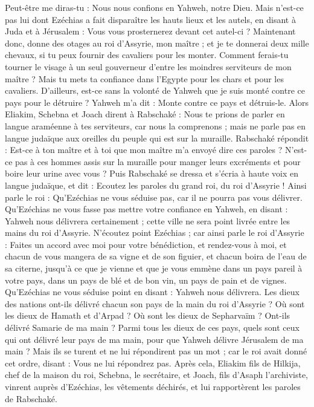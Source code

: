 \begin{multicols}{2}
Peut-être me diras-tu : Nous nous confions en Yahweh, notre Dieu. Mais n'est-ce pas lui dont Ezéchias a fait disparaître les hauts lieux et les autels, en disant à Juda et à Jérusalem : Vous vous prosternerez devant cet autel-ci ?
Maintenant donc, donne des otages au roi d’Assyrie, mon maître ; et je te donnerai deux mille chevaux, si tu peux fournir des cavaliers pour les monter.
Comment ferais-tu tourner le visage à un seul gouverneur d’entre les moindres serviteurs de mon maître ? Mais tu mets ta confiance dans l'Egypte pour les chars et pour les cavaliers.
D’ailleurs, est-ce sans la volonté de Yahweh que je suis monté contre ce pays pour le détruire ? Yahweh m'a dit : Monte contre ce pays et détruis-le.
Alors Eliakim, Schebna et Joach dirent à Rabschaké : Nous te prions de parler en langue araméenne à tes serviteurs, car nous la comprenons ; mais ne parle pas en langue judaïque aux oreilles du peuple qui est sur la muraille.
Rabschaké répondit : Est-ce à ton maître et à toi que mon maître m’a envoyé dire ces paroles ? N’est-ce pas à ces hommes assis sur la muraille pour manger leurs excréments et pour boire leur urine avec vous ?
Puis Rabschaké se dressa et s'écria à haute voix en langue judaïque, et dit : Ecoutez les paroles du grand roi, du roi d’Assyrie !
Ainsi parle le roi : Qu'Ezéchias ne vous séduise pas, car il ne pourra pas vous délivrer.
Qu'Ezéchias ne vous fasse pas mettre votre confiance en Yahweh, en disant : Yahweh nous délivrera certainement ; cette ville ne sera point livrée entre les mains du roi d’Assyrie.
N'écoutez point Ezéchias ; car ainsi parle le roi d’Assyrie : Faites un accord avec moi pour votre bénédiction, et rendez-vous à moi, et chacun de vous mangera de sa vigne et de son figuier, et chacun boira de l'eau de sa citerne,
jusqu'à ce que je vienne et que je vous emmène dans un pays pareil à votre pays, dans un pays de blé et de bon vin, un pays de pain et de vignes.
Qu'Ezéchias ne vous séduise point en disant : Yahweh nous délivrera. Les dieux des nations ont-ils délivré chacun son pays de la main du roi d’Assyrie ?
Où sont les dieux de Hamath et d'Arpad ? Où sont les dieux de Sepharvaïm ? Ont-ils délivré Samarie de ma main ?
Parmi tous les dieux de ces pays, quels sont ceux qui ont délivré leur pays de ma main, pour que Yahweh délivre Jérusalem de ma main ?
Mais ils se turent et ne lui répondirent pas un mot ; car le roi avait donné cet ordre, disant : Vous ne lui répondrez pas.
Après cela, Eliakim fils de Hilkija, chef de la maison du roi, Schebna, le secrétaire, et Joach, fils d'Asaph l’archiviste, vinrent auprès d’Ezéchias, les vêtements déchirés, et lui rapportèrent les paroles de Rabschaké.

\end{multicols}
